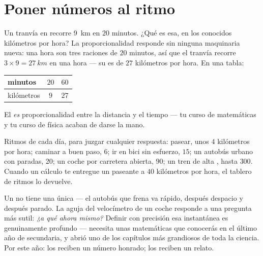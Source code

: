 \section{Poner números al ritmo}

\begin{example}\label{ex:g6:describing-motion:proportion}
Un tranvía en  recorre \qty{9}{km} en $20$
minutos. ¿Qué  es esa, en los conocidos kilómetros por
hora? La proporcionalidad responde sin ninguna maquinaria nueva: una
hora son tres raciones de $20$ minutos, así que el tranvía recorre
$3 \times 9 = \qty{27}{km}$ en una hora --- su  es de $27$
kilómetros por hora. En una tabla:
\begin{center}
\begin{tabular}{l|cc}
minutos & $20$ & $60$ \\
\hline
kilómetros & $9$ & $27$
\end{tabular}
\end{center}
El  \emph{es} proporcionalidad entre la distancia
y el tiempo --- tu curso de matemáticas y tu curso de física acaban de
darse la mano.
\end{example}

\begin{example}\label{ex:g6:describing-motion:paces}
Ritmos de cada día, para juzgar cualquier respuesta: pasear, unos $4$
kilómetros por hora; caminar a buen paso, $6$; ir en bici sin
esfuerzo, $15$; un autobús urbano con paradas, $20$; un coche por
carretera abierta, $90$; un tren de alta , hasta $300$.
Cuando un cálculo te entregue un paseante a $40$ kilómetros por hora,
el tablero de ritmos lo devuelve.
\end{example}

\begin{remark}\label{rem:g6:describing-motion:instant}
Un  no tiene una única  --- el
autobús que frena va rápido, después despacio y después parado. La
aguja del velocímetro de un coche responde a una pregunta más sutil:
\emph{¿a qué  ahora mismo?} Definir con precisión esa
 instantánea es genuinamente profundo --- necesita unas
matemáticas que conocerás en el último año de secundaria, y abrió uno
de los capítulos más grandiosos de toda la ciencia. Por este año: los
 reciben un número honrado; los
 reciben un relato.
\end{remark}

